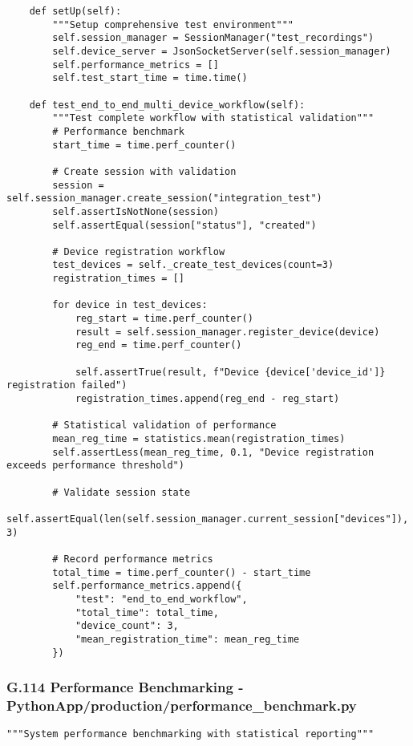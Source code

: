 \documentclass[12pt,a4paper]{article}
\begin{document}
{{\begin{verbatim}
    def setUp(self):
        """Setup comprehensive test environment"""
        self.session_manager = SessionManager("test_recordings")
        self.device_server = JsonSocketServer(self.session_manager)
        self.performance_metrics = []
        self.test_start_time = time.time()
        
    def test_end_to_end_multi_device_workflow(self):
        """Test complete workflow with statistical validation"""
        # Performance benchmark
        start_time = time.perf_counter()
        
        # Create session with validation
        session = self.session_manager.create_session("integration_test")
        self.assertIsNotNone(session)
        self.assertEqual(session["status"], "created")
        
        # Device registration workflow
        test_devices = self._create_test_devices(count=3)
        registration_times = []
        
        for device in test_devices:
            reg_start = time.perf_counter()
            result = self.session_manager.register_device(device)
            reg_end = time.perf_counter()
            
            self.assertTrue(result, f"Device {device['device_id']} registration failed")
            registration_times.append(reg_end - reg_start)
        
        # Statistical validation of performance
        mean_reg_time = statistics.mean(registration_times)
        self.assertLess(mean_reg_time, 0.1, "Device registration exceeds performance threshold")
        
        # Validate session state
        self.assertEqual(len(self.session_manager.current_session["devices"]), 3)
        
        # Record performance metrics
        total_time = time.perf_counter() - start_time
        self.performance_metrics.append({
            "test": "end_to_end_workflow",
            "total_time": total_time,
            "device_count": 3,
            "mean_registration_time": mean_reg_time
        })
\end{verbatim}

\subsubsection{G.114 Performance Benchmarking - PythonApp/production/performance_benchmark.py}

\begin{verbatim}
"""System performance benchmarking with statistical reporting"""


\end{verbatim}}}
\end{document}
